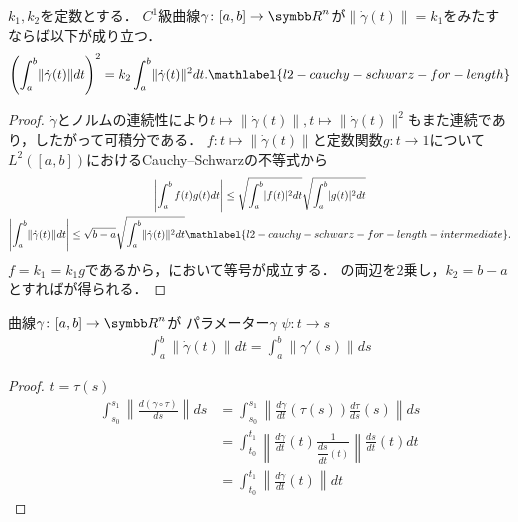 \documentclass{ltjsbook}
\begin{document}
\begin{thmbox}
\begin{proposition}
\(k_1, k_2\)を定数とする．
\(C^1\)級曲線\(\gamma \colon [a, b] \to {\Real}^n\)が\(\lVert \dot{\gamma}(t) \rVert = k_1\)をみたすならば以下が成り立つ．
\begin{align}
    \left(\int_a^b \lVert \dot{\gamma}(t) \rVert dt \right)^2
    = k_2 \int_a^b \lVert \dot{\gamma}(t) \rVert^2 dt.
    \mathlabel{l2-cauchy-schwarz-for-length}
\end{align}
\end{proposition}
\end{thmbox}

\begin{proof} \(\dot{\gamma}\)とノルムの連続性により\(t \mapsto \lVert \dot{\gamma}(t) \rVert, t \mapsto \lVert \dot{\gamma}(t) \rVert^2\)もまた連続であり，したがって可積分である．
\(f\colon t \mapsto \lVert \dot{\gamma}(t) \rVert\)と定数関数\(g \colon t \to 1\)について\(L^2([a, b])\)におけるCauchy--Schwarzの不等式から
\begin{gather}
    \left\lvert \int_a^b f(t) g(t) dt \right\rvert \leq \sqrt{\int_a^b \lvert f(t) \rvert^2 dt} \sqrt{\int_a^b \lvert g(t) \rvert^2 dt} \notag \\
    \left\lvert \int_a^b \lVert \dot{\gamma}(t) \rVert dt \right\rvert \leq \sqrt{b - a} \sqrt{\int_a^b \lVert \dot{\gamma}(t) \rVert^2 dt} \mathlabel{l2-cauchy-schwarz-for-length-intermediate}.
\end{gather}
\(f = k_1 = k_1 g\)であるから，において等号が成立する．
の両辺を\(2\)乗し，\(k_2 = b - a\)とすればが得られる．
\end{proof}

\begin{thmbox}
\begin{proposition}
曲線\(\gamma\colon [a, b] \to {\Real}^n\)が
パラメーター\(\gamma\)
\(\psi\colon t \to s\)
\begin{align*}
    \int_a^b \lVert \dot{\gamma}(t) \rVert dt
    = \int_a^b \lVert \gamma'(s) \rVert ds
\end{align*}
\end{proposition}
\end{thmbox}

\begin{proof}
\(t = \tau(s)\)
\begin{align*}
    \int_{s_0}^{s_1} \left\lVert \frac{d(\gamma \circ \tau)}{ds}\right\rVert ds
    &= \int_{s_0}^{s_1} \left\lVert \frac{d\gamma}{dt}(\tau(s)) \frac{d\tau}{ds}(s) \right\rVert ds \\
    &= \int_{t_0}^{t_1} \left\lVert \frac{d\gamma}{dt}(t) \frac{1}{\dfrac{ds}{dt}(t)} \right\rVert \frac{ds}{dt}(t) dt \\
    &= \int_{t_0}^{t_1} \left\lVert \frac{d\gamma}{dt}(t) \right\rVert dt
\end{align*}
\end{proof}
\end{document}
